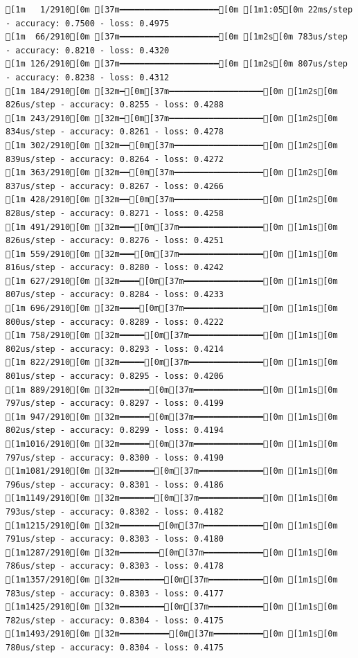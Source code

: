 \documentclass[
  letterpaper,
  DIV=11,
  numbers=noendperiod]{scrartcl}
\begin{document}
\begin{verbatim}
[1m   1/2910[0m [37m━━━━━━━━━━━━━━━━━━━━[0m [1m1:05[0m 22ms/step - accuracy: 0.7500 - loss: 0.4975
[1m  66/2910[0m [37m━━━━━━━━━━━━━━━━━━━━[0m [1m2s[0m 783us/step - accuracy: 0.8210 - loss: 0.4320 
[1m 126/2910[0m [37m━━━━━━━━━━━━━━━━━━━━[0m [1m2s[0m 807us/step - accuracy: 0.8238 - loss: 0.4312
[1m 184/2910[0m [32m━[0m[37m━━━━━━━━━━━━━━━━━━━[0m [1m2s[0m 826us/step - accuracy: 0.8255 - loss: 0.4288
[1m 243/2910[0m [32m━[0m[37m━━━━━━━━━━━━━━━━━━━[0m [1m2s[0m 834us/step - accuracy: 0.8261 - loss: 0.4278
[1m 302/2910[0m [32m━━[0m[37m━━━━━━━━━━━━━━━━━━[0m [1m2s[0m 839us/step - accuracy: 0.8264 - loss: 0.4272
[1m 363/2910[0m [32m━━[0m[37m━━━━━━━━━━━━━━━━━━[0m [1m2s[0m 837us/step - accuracy: 0.8267 - loss: 0.4266
[1m 428/2910[0m [32m━━[0m[37m━━━━━━━━━━━━━━━━━━[0m [1m2s[0m 828us/step - accuracy: 0.8271 - loss: 0.4258
[1m 491/2910[0m [32m━━━[0m[37m━━━━━━━━━━━━━━━━━[0m [1m1s[0m 826us/step - accuracy: 0.8276 - loss: 0.4251
[1m 559/2910[0m [32m━━━[0m[37m━━━━━━━━━━━━━━━━━[0m [1m1s[0m 816us/step - accuracy: 0.8280 - loss: 0.4242
[1m 627/2910[0m [32m━━━━[0m[37m━━━━━━━━━━━━━━━━[0m [1m1s[0m 807us/step - accuracy: 0.8284 - loss: 0.4233
[1m 696/2910[0m [32m━━━━[0m[37m━━━━━━━━━━━━━━━━[0m [1m1s[0m 800us/step - accuracy: 0.8289 - loss: 0.4222
[1m 758/2910[0m [32m━━━━━[0m[37m━━━━━━━━━━━━━━━[0m [1m1s[0m 802us/step - accuracy: 0.8293 - loss: 0.4214
[1m 822/2910[0m [32m━━━━━[0m[37m━━━━━━━━━━━━━━━[0m [1m1s[0m 801us/step - accuracy: 0.8295 - loss: 0.4206
[1m 889/2910[0m [32m━━━━━━[0m[37m━━━━━━━━━━━━━━[0m [1m1s[0m 797us/step - accuracy: 0.8297 - loss: 0.4199
[1m 947/2910[0m [32m━━━━━━[0m[37m━━━━━━━━━━━━━━[0m [1m1s[0m 802us/step - accuracy: 0.8299 - loss: 0.4194
[1m1016/2910[0m [32m━━━━━━[0m[37m━━━━━━━━━━━━━━[0m [1m1s[0m 797us/step - accuracy: 0.8300 - loss: 0.4190
[1m1081/2910[0m [32m━━━━━━━[0m[37m━━━━━━━━━━━━━[0m [1m1s[0m 796us/step - accuracy: 0.8301 - loss: 0.4186
[1m1149/2910[0m [32m━━━━━━━[0m[37m━━━━━━━━━━━━━[0m [1m1s[0m 793us/step - accuracy: 0.8302 - loss: 0.4182
[1m1215/2910[0m [32m━━━━━━━━[0m[37m━━━━━━━━━━━━[0m [1m1s[0m 791us/step - accuracy: 0.8303 - loss: 0.4180
[1m1287/2910[0m [32m━━━━━━━━[0m[37m━━━━━━━━━━━━[0m [1m1s[0m 786us/step - accuracy: 0.8303 - loss: 0.4178
[1m1357/2910[0m [32m━━━━━━━━━[0m[37m━━━━━━━━━━━[0m [1m1s[0m 783us/step - accuracy: 0.8303 - loss: 0.4177
[1m1425/2910[0m [32m━━━━━━━━━[0m[37m━━━━━━━━━━━[0m [1m1s[0m 782us/step - accuracy: 0.8304 - loss: 0.4175
[1m1493/2910[0m [32m━━━━━━━━━━[0m[37m━━━━━━━━━━[0m [1m1s[0m 780us/step - accuracy: 0.8304 - loss: 0.4175

\end{verbatim}
\end{document}
